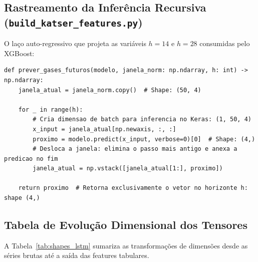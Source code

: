 \documentclass[11pt,a4paper]{article}
\begin{document}
\subsection{Rastreamento da Inferência Recursiva (\texttt{build\_katser\_features.py})}
O laço auto-regressivo que projeta as variáveis $h=14$ e $h=28$ consumidas pelo XGBoost:

\begin{lstlisting}
def prever_gases_futuros(modelo, janela_norm: np.ndarray, h: int) -> np.ndarray:
    janela_atual = janela_norm.copy()  # Shape: (50, 4)

    for _ in range(h):
        # Cria dimensao de batch para inferencia no Keras: (1, 50, 4)
        x_input = janela_atual[np.newaxis, :, :]
        proximo = modelo.predict(x_input, verbose=0)[0]  # Shape: (4,)
        # Desloca a janela: elimina o passo mais antigo e anexa a predicao no fim
        janela_atual = np.vstack([janela_atual[1:], proximo])

    return proximo  # Retorna exclusivamente o vetor no horizonte h: shape (4,)
\end{lstlisting}

\subsection{Tabela de Evolução Dimensional dos Tensores}
A Tabela~\ref{tab:shapes_lstm} sumariza as transformações de dimensões desde as séries brutas até a saída das features tabulares.
\end{document}
